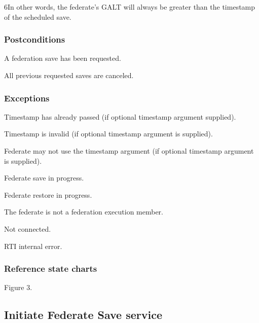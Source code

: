 6In other words, the federate's GALT will always be greater than the timestamp of the scheduled save.

\clearpage


\subsubsection{Postconditions}

\begin{stdalphalist}
    \item A federation save has been requested.
    \item All previous requested saves are canceled.
\end{stdalphalist}

\subsubsection{Exceptions}

\begin{stdalphalist}
    \item Timestamp has already passed (if optional timestamp argument supplied).
    \item Timestamp is invalid (if optional timestamp argument is supplied).
    \item Federate may not use the timestamp argument (if optional timestamp argument is supplied).
    \item Federate save in progress.
    \item Federate restore in progress.
    \item The federate is not a federation execution member.
    \item Not connected.
    \item RTI internal error.
\end{stdalphalist}

\subsubsection{Reference state charts}

\begin{stdalphalist}
    \item Figure 3.
\end{stdalphalist}

\subsection{Initiate Federate Save \rtiinitiated{} service}

